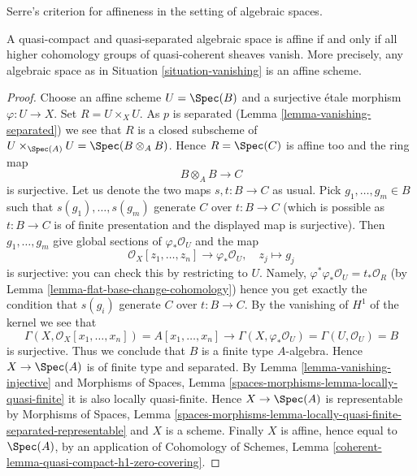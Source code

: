 \begin{proposition}
\label{proposition-vanishing-affine}
\begin{slogan}
Serre's criterion for affineness in the setting of algebraic spaces.
\end{slogan}
A quasi-compact and quasi-separated algebraic space is affine
if and only if all higher cohomology groups of quasi-coherent sheaves
vanish. More precisely, any algebraic space as in
Situation \ref{situation-vanishing} is an affine scheme.
\end{proposition}

\begin{proof}
Choose an affine scheme $U = \Spec(B)$ and a surjective \'etale
morphism $\varphi : U \to X$. Set $R = U \times_X U$. As $p$ is separated
(Lemma \ref{lemma-vanishing-separated}) we see that $R$ is a
closed subscheme of $U \times_{\Spec(A)} U = \Spec(B \otimes_A B)$.
Hence $R = \Spec(C)$ is affine too and the ring map
$$
B \otimes_A B \longrightarrow C
$$
is surjective. Let us denote the two maps $s, t : B \to C$ as usual. Pick
$g_1, \ldots, g_m \in B$ such that $s(g_1), \ldots, s(g_m)$ generate $C$
over $t : B \to C$ (which is possible as $t : B \to C$ is of finite
presentation and the displayed map is surjective). Then $g_1, \ldots, g_m$
give global sections of $\varphi_*\mathcal{O}_U$ and the map
$$
\mathcal{O}_X[z_1, \ldots, z_n] \longrightarrow \varphi_*\mathcal{O}_U,
\quad
z_j \longmapsto g_j
$$
is surjective: you can check this by restricting to $U$.
Namely, $\varphi^*\varphi_*\mathcal{O}_U = t_*\mathcal{O}_R$
(by Lemma \ref{lemma-flat-base-change-cohomology})
hence you get exactly the condition that $s(g_i)$ generate $C$
over $t : B \to C$. By the vanishing of $H^1$ of the kernel we see that
$$
\Gamma(X, \mathcal{O}_X[x_1, \ldots, x_n]) =
A[x_1, \ldots, x_n] \longrightarrow
\Gamma(X, \varphi_*\mathcal{O}_U) = \Gamma(U, \mathcal{O}_U) = B
$$
is surjective. Thus we conclude that $B$ is a finite type $A$-algebra.
Hence $X \to \Spec(A)$ is of finite type and separated.
By Lemma \ref{lemma-vanishing-injective}
and
Morphisms of Spaces, Lemma \ref{spaces-morphisms-lemma-locally-quasi-finite}
it is also locally quasi-finite. Hence $X \to \Spec(A)$ is representable by
Morphisms of Spaces, Lemma
\ref{spaces-morphisms-lemma-locally-quasi-finite-separated-representable}
and $X$ is a scheme. Finally $X$ is affine, hence equal to $\Spec(A)$,
by an application of Cohomology of Schemes, Lemma
\ref{coherent-lemma-quasi-compact-h1-zero-covering}.
\end{proof}

